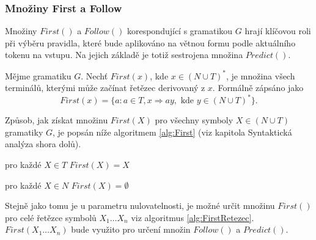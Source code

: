 \subsubsection{Množiny First a Follow}
Množiny $First()$ a $Follow()$ korespondující s gramatikou $G$ hrají klíčovou roli při výběru pravidla, které bude aplikováno na větnou formu podle aktuálního tokenu na vstupu.
Na jejich základě je totiž sestrojena množina $Predict()$.

\begin{definice}
  Mějme gramatiku $G$. Nechť $First(x)$, kde $x \in (N \cup T)^*$, je množina všech terminálů, kterými může začínat řetězec derivovaný z $x$. Formálně zápsáno jako
  $$First(x) = \{a\!: a \in T, x \Rightarrow ay, \text{\ kde\ } y \in (N \cup T)^*\}.$$
\end{definice}
Způsob, jak získat množinu $First(X)$ pro všechny symboly $X \in (N \cup T)$ gramatiky $G$, je popsán níže algoritmem \ref{alg:First} (viz \cite{IFJ:2017} kapitola Syntaktická analýza shora dolů).

\begin{algorithm}[H]
  \DontPrintSemicolon
  \SetAlgoNoLine
  \SetAlgoNoEnd
  \BlankLine

  \SetNlSty{}{}{:}
  \SetNlSkip{-1.1em}

  \Indp\Indpp
  pro každé $X \in T$\KwColon\;
  \Indp
  $First(X) = {X}$\;
  \Indm

  \;

  pro každé $X \in N$\KwColon\;
  \Indp
  $First(X) = \emptyset$\;
  \Indm
  \;

  \caption{\textsc{$First(X)$}} \label{alg:First}
\end{algorithm}

Stejně jako tomu je u parametru nulovatelnosti, je možné určit množinu $First()$ pro celé řetězce symbolů $X_1 \dots X_n$ viz algoritmus \ref{alg:FirstRetezec}.
$First(X_1 \dots X_n)$ bude využito pro určení množin $Follow()$ a $Predict()$.

